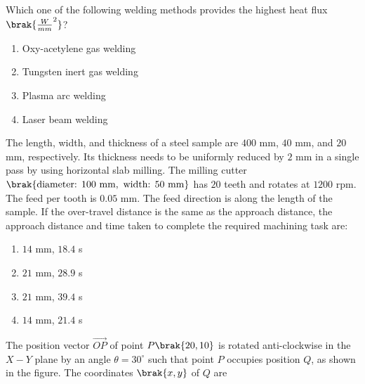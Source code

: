 
\iffalse
    \title{Assignment}
    \author{EE24BTECH11034}
    \section{ce}
    \chapter{2023}
  \fi
\item Which one of the following welding methods provides the highest heat flux $\brak{\frac{W}{mm}^2}$?

\begin{enumerate}
    \item Oxy-acetylene gas welding
    \item Tungsten inert gas welding
    \item Plasma arc welding
    \item Laser beam welding
\end{enumerate}

\item The length, width, and thickness of a steel sample are $400$ mm, $40$ mm, and $20$ mm, respectively. Its thickness needs to be uniformly reduced by $2$ mm in a single pass by using horizontal slab milling. The milling cutter $\brak{\text{diameter: } 100 \text{ mm}, \text{ width: } 50 \text{ mm}}$ has $20$ teeth and rotates at $1200$ rpm. The feed per tooth is $0.05$ mm. The feed direction is along the length of the sample. If the over-travel distance is the same as the approach distance, the approach distance and time taken to complete the required machining task are:

\begin{enumerate}
    \item $14$ mm, $18.4$ s
    \item $21$ mm, $28.9$ s
    \item $21$ mm, $39.4$ s
    \item $14$ mm, $21.4$ s
\end{enumerate}

\item The position vector $\overrightarrow{OP}$ of point $P \brak{20, 10}$ is rotated anti-clockwise in the $X-Y$ plane by an angle $\theta = 30^\circ$ such that point $P$ occupies position $Q$, as shown in the figure. The coordinates $\brak{x, y}$ of $Q$ are

\begin{center}
\end{center}

